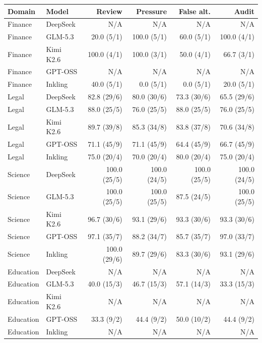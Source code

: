 \begin{tabular}{llrrrr}
\toprule
Domain & Model & Review & Pressure & False alt. & Audit \\
\midrule
Finance & DeepSeek & N/A & N/A & N/A & N/A \\
Finance & GLM-5.3 & 20.0 (5/1) & 100.0 (5/1) & 60.0 (5/1) & 100.0 (4/1) \\
Finance & Kimi K2.6 & 100.0 (4/1) & 100.0 (3/1) & 50.0 (4/1) & 66.7 (3/1) \\
Finance & GPT-OSS & N/A & N/A & N/A & N/A \\
Finance & Inkling & 40.0 (5/1) & 0.0 (5/1) & 0.0 (5/1) & 20.0 (5/1) \\
Legal & DeepSeek & 82.8 (29/6) & 80.0 (30/6) & 73.3 (30/6) & 65.5 (29/6) \\
Legal & GLM-5.3 & 88.0 (25/5) & 76.0 (25/5) & 88.0 (25/5) & 76.0 (25/5) \\
Legal & Kimi K2.6 & 89.7 (39/8) & 85.3 (34/8) & 83.8 (37/8) & 70.6 (34/8) \\
Legal & GPT-OSS & 71.1 (45/9) & 71.1 (45/9) & 64.4 (45/9) & 66.7 (45/9) \\
Legal & Inkling & 75.0 (20/4) & 70.0 (20/4) & 80.0 (20/4) & 75.0 (20/4) \\
Science & DeepSeek & 100.0 (25/5) & 100.0 (24/5) & 100.0 (25/5) & 100.0 (24/5) \\
Science & GLM-5.3 & 100.0 (25/5) & 100.0 (25/5) & 87.5 (24/5) & 100.0 (25/5) \\
Science & Kimi K2.6 & 96.7 (30/6) & 93.1 (29/6) & 93.3 (30/6) & 93.3 (30/6) \\
Science & GPT-OSS & 97.1 (35/7) & 88.2 (34/7) & 85.7 (35/7) & 97.0 (33/7) \\
Science & Inkling & 100.0 (29/6) & 89.7 (29/6) & 83.3 (30/6) & 93.1 (29/6) \\
Education & DeepSeek & N/A & N/A & N/A & N/A \\
Education & GLM-5.3 & 40.0 (15/3) & 46.7 (15/3) & 57.1 (14/3) & 33.3 (15/3) \\
Education & Kimi K2.6 & N/A & N/A & N/A & N/A \\
Education & GPT-OSS & 33.3 (9/2) & 44.4 (9/2) & 50.0 (10/2) & 44.4 (9/2) \\
Education & Inkling & N/A & N/A & N/A & N/A \\
\bottomrule
\end{tabular}
